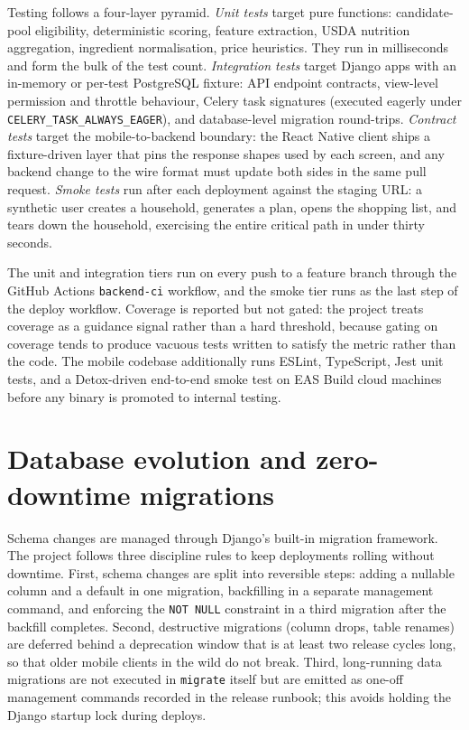 Testing follows a four-layer pyramid. \emph{Unit tests} target pure functions: candidate-pool eligibility, deterministic scoring, feature extraction, USDA nutrition aggregation, ingredient normalisation, price heuristics. They run in milliseconds and form the bulk of the test count. \emph{Integration tests} target Django apps with an in-memory or per-test PostgreSQL fixture: API endpoint contracts, view-level permission and throttle behaviour, Celery task signatures (executed eagerly under \texttt{CELERY\_TASK\_ALWAYS\_EAGER}), and database-level migration round-trips. \emph{Contract tests} target the mobile-to-backend boundary: the React Native client ships a fixture-driven layer that pins the response shapes used by each screen, and any backend change to the wire format must update both sides in the same pull request. \emph{Smoke tests} run after each deployment against the staging URL: a synthetic user creates a household, generates a plan, opens the shopping list, and tears down the household, exercising the entire critical path in under thirty seconds.

The unit and integration tiers run on every push to a feature branch through the GitHub Actions \texttt{backend-ci} workflow, and the smoke tier runs as the last step of the deploy workflow. Coverage is reported but not gated: the project treats coverage as a guidance signal rather than a hard threshold, because gating on coverage tends to produce vacuous tests written to satisfy the metric rather than the code. The mobile codebase additionally runs ESLint, TypeScript, Jest unit tests, and a Detox-driven end-to-end smoke test on EAS Build cloud machines before any binary is promoted to internal testing.

\section{Database evolution and zero-downtime migrations}

Schema changes are managed through Django's built-in migration framework. The project follows three discipline rules to keep deployments rolling without downtime. First, schema changes are split into reversible steps: adding a nullable column and a default in one migration, backfilling in a separate management command, and enforcing the \texttt{NOT NULL} constraint in a third migration after the backfill completes. Second, destructive migrations (column drops, table renames) are deferred behind a deprecation window that is at least two release cycles long, so that older mobile clients in the wild do not break. Third, long-running data migrations are not executed in \texttt{migrate} itself but are emitted as one-off management commands recorded in the release runbook; this avoids holding the Django startup lock during deploys.

